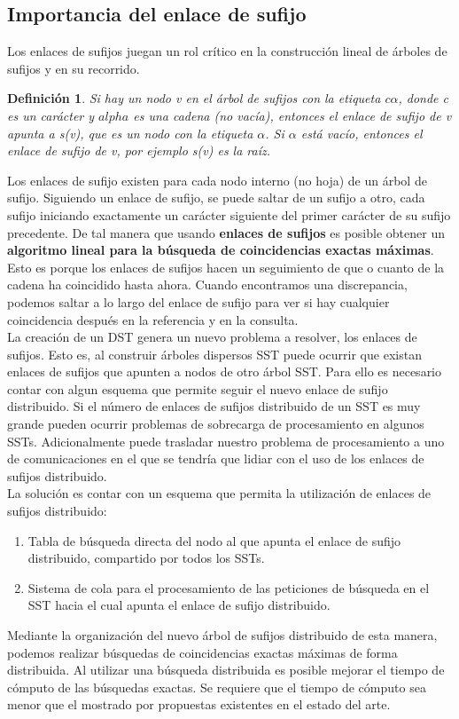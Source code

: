 \documentclass[12pt,a4paper]{article}
\newtheorem{mydef}{Definición}
\begin{document}
\subsection{Importancia del enlace de sufijo}
\indent
Los enlaces de sufijos juegan un rol crítico en la construcción lineal de árboles de sufijos y en su
recorrido.
\begin{mydef}
  Si hay un nodo v en el árbol de sufijos con la etiqueta $c\alpha$, donde c es un carácter y $alpha$
  es una cadena (no vacía), entonces el enlace de sufijo de v apunta a s(v), que es un nodo con la
  etiqueta $\alpha$. Si $\alpha$ está vacío, entonces el enlace de sufijo de v, por ejemplo s(v) es la
  raíz. 
\end{mydef}
\indent
Los enlaces de sufijo existen para cada nodo interno (no hoja) de un árbol de sufijo. Siguiendo un 
enlace de sufijo, se puede saltar de un sufijo a otro, cada sufijo iniciando exactamente un carácter
siguiente del primer carácter de su sufijo precedente. De tal manera que usando \textbf{enlaces de sufijos} es
posible obtener un \textbf{algoritmo lineal para la búsqueda de coincidencias exactas máximas}. Esto es porque
los enlaces de sufijos hacen un seguimiento de que o cuanto de la cadena ha coincidido hasta ahora.
Cuando encontramos una discrepancia, podemos saltar a lo largo del enlace de sufijo para 
ver si hay cualquier coincidencia después en la referencia y en la consulta.\\
\indent
La creación de un DST genera un nuevo problema a resolver, los enlaces de sufijos. Esto es, al construir árboles dispersos SST puede ocurrir que existan enlaces de sufijos que apunten a nodos de otro árbol SST. Para ello es necesario contar con algun esquema que permite seguir el nuevo enlace de sufijo distribuido. Si el número de enlaces de sufijos distribuido de un SST es muy grande pueden ocurrir problemas de sobrecarga de procesamiento en algunos SSTs. Adicionalmente puede trasladar nuestro problema de procesamiento a uno de comunicaciones en el que se tendría que lidiar con el uso de los enlaces de sufijos distribuido.\\
\indent
La solución es contar con un esquema que permita la utilización de enlaces de sufijos distribuido:
\begin{enumerate}
\item Tabla de búsqueda directa del nodo al que apunta el enlace de sufijo distribuido, compartido por todos los SSTs.
\item Sistema de cola para el procesamiento de las peticiones de búsqueda en el SST hacia el cual apunta el enlace de sufijo distribuido.
\end{enumerate}
\indent
Mediante la organización del nuevo árbol de sufijos distribuido de esta manera, 
podemos realizar búsquedas de coincidencias exactas máximas de forma distribuida. Al
utilizar una búsqueda distribuida es posible mejorar el tiempo de cómputo de 
las búsquedas exactas. Se requiere que el tiempo de cómputo sea menor que el 
mostrado por propuestas existentes en el estado del arte.\\
\end{document}

